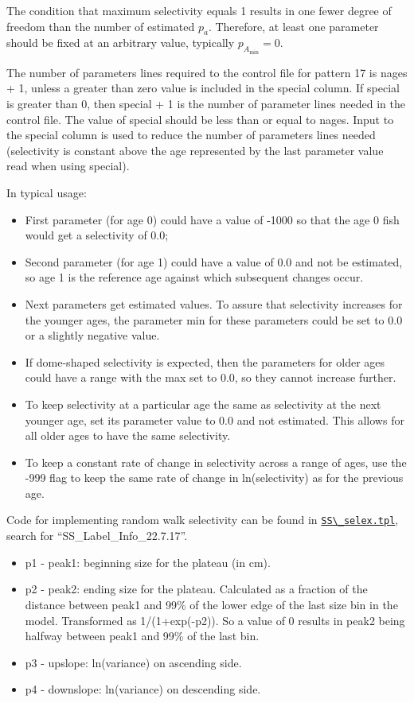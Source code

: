 The condition that maximum selectivity equals 1 results in one fewer degree of freedom than the number of estimated $p_a$. Therefore, at least one parameter should be fixed at an arbitrary value, typically $p_{A_{\text{min}}}=0$.

The number of parameters lines required to the control file for pattern 17 is nages + 1, unless a greater than zero value is included in the special column. If special is greater than 0, then special + 1 is the number of parameter lines needed in the control file. The value of special should be less than or equal to nages. Input to the special column is used to reduce the number of parameters lines needed (selectivity is constant above the age represented by the last parameter value read when using special). 
	
In typical usage:
	\begin{itemize}
		\item First parameter (for age 0) could have a value of -1000 so that the age 0 fish would get a selectivity of 0.0;
		\item Second parameter (for age 1) could have a value of 0.0 and not be estimated, so age 1 is the reference age against which subsequent changes occur.
		\item Next parameters get estimated values. To assure that selectivity increases for the younger ages, the parameter min for these parameters could be set to 0.0 or a slightly negative value.
		\item If dome-shaped selectivity is expected, then the parameters for older ages could have a range with the max set to 0.0, so they cannot increase further.
		\item To keep selectivity at a particular age the same as selectivity at the next younger age, set its parameter value to 0.0 and not estimated. This allows for all older ages to have the same selectivity.
		\item To keep a constant rate of change in selectivity across a range of ages, use the -999 flag to keep the same rate of change in ln(selectivity) as for the previous age.
	\end{itemize}

Code for implementing random walk selectivity can be found in \href{https://github.com/nmfs-ost/ss3-source-code/blob/main/SS_selex.tpl}{\verb|SS\_selex.tpl|}, search for ``SS\_Label\_Info\_22.7.17''.

	\begin{itemize}
		\item p1 - peak1: beginning size for the plateau (in cm).
		\item p2 - peak2: ending size for the plateau. Calculated as a fraction of the distance between peak1 and 99\% of the lower edge of the last size bin in the model. Transformed as 1/(1+exp(-p2)). So a value of 0 results in peak2 being halfway between peak1 and 99\% of the last bin.
		\item p3 - upslope: ln(variance) on ascending side.
		\item p4 - downslope: ln(variance) on descending side.
	\end{itemize}

